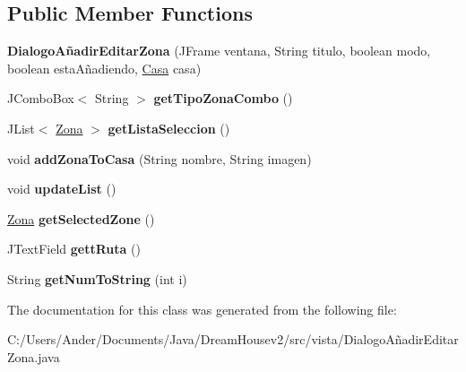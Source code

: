 \subsection*{Public Member Functions}
\begin{DoxyCompactItemize}
\item 
\mbox{\label{classvista_1_1_dialogo_a_xC3_xB1adir_editar_zona_a334c1d2bbdfd703144f614e5b17cd5a7}} 
{\bfseries Dialogo\+Añadir\+Editar\+Zona} (J\+Frame ventana, String titulo, boolean modo, boolean esta\+Añadiendo, \mbox{\hyperlink{classmodelo_1_1_casa}{Casa}} casa)
\item 
\mbox{\label{classvista_1_1_dialogo_a_xC3_xB1adir_editar_zona_a0d49235e9285853b6cc0a786b7068a3a}} 
J\+Combo\+Box$<$ String $>$ {\bfseries get\+Tipo\+Zona\+Combo} ()
\item 
\mbox{\label{classvista_1_1_dialogo_a_xC3_xB1adir_editar_zona_a996c5821e4f9c2abbc6e89be634434a7}} 
J\+List$<$ \mbox{\hyperlink{classmodelo_1_1_zona}{Zona}} $>$ {\bfseries get\+Lista\+Seleccion} ()
\item 
\mbox{\label{classvista_1_1_dialogo_a_xC3_xB1adir_editar_zona_ad6de9a76fc2e11bdf48dca18e82f3e81}} 
void {\bfseries add\+Zona\+To\+Casa} (String nombre, String imagen)
\item 
\mbox{\label{classvista_1_1_dialogo_a_xC3_xB1adir_editar_zona_a371fa7858769811260180c8774cf73b3}} 
void {\bfseries update\+List} ()
\item 
\mbox{\label{classvista_1_1_dialogo_a_xC3_xB1adir_editar_zona_a0d9cc9f81e61823751e28641da9834f1}} 
\mbox{\hyperlink{classmodelo_1_1_zona}{Zona}} {\bfseries get\+Selected\+Zone} ()
\item 
\mbox{\label{classvista_1_1_dialogo_a_xC3_xB1adir_editar_zona_a8916fda5ffd99498a6260218cf310aa2}} 
J\+Text\+Field {\bfseries gett\+Ruta} ()
\item 
\mbox{\label{classvista_1_1_dialogo_a_xC3_xB1adir_editar_zona_a43768ac16ac5a29ae9c6064065c0cb02}} 
String {\bfseries get\+Num\+To\+String} (int i)
\end{DoxyCompactItemize}


The documentation for this class was generated from the following file\+:\begin{DoxyCompactItemize}
\item 
C\+:/\+Users/\+Ander/\+Documents/\+Java/\+Dream\+Housev2/src/vista/Dialogo\+Añadir\+Editar\+Zona.\+java\end{DoxyCompactItemize}
